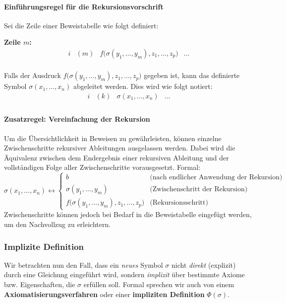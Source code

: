\documentclass[main.tex]{subfiles}
\begin{document}
\paragraph{Einführungsregel für die Rekursionsvorschrift}
Sei die Zeile einer Beweistabelle wie folgt definiert:

\textbf{Zeile \(m\):}
\[
\begin{array}{llll}
   i & (m) & f\big(\sigma(y_1, \ldots, y_m), z_1, \ldots, z_p\big) & \dots \\
\end{array}
\]

Falls der Ausdruck \(f\big(\sigma(y_1, \ldots, y_m), z_1, \ldots, z_p\big)\) gegeben ist, kann das definierte Symbol \(\sigma(x_1, \ldots, x_n)\) abgeleitet werden. Dies wird wie folgt notiert:
\[
\begin{array}{llll}
   i & (k) & \sigma(x_1, \ldots, x_n) & ... \\
\end{array}
\]

\paragraph{Zusatzregel: Vereinfachung der Rekursion}
Um die Übersichtlichkeit in Beweisen zu gewährleisten, können einzelne Zwischenschritte rekursiver Ableitungen ausgelassen werden. Dabei wird die Äquivalenz zwischen dem Endergebnis einer rekursiven Ableitung und der vollständigen Folge aller Zwischenschritte vorausgesetzt. Formal:
\[
\sigma(x_1, \ldots, x_n) \leftrightarrow 
\begin{cases} 
    b & \text{(nach endlicher Anwendung der Rekursion)} \\
    \sigma(y_1, \ldots, y_m) & \text{(Zwischenschritt der Rekursion)} \\
    f\big(\sigma(y_1, \ldots, y_m), z_1, \ldots, z_p\big) & \text{(Rekursionsschritt)}
\end{cases}
\]
Zwischenschritte können jedoch bei Bedarf in die Beweistabelle eingefügt werden, um den Nachvollzug zu erleichtern.


\subsubsection{Implizite Definition}
Wir betrachten nun den Fall, dass ein \emph{neues} Symbol \(\sigma\) nicht \emph{direkt} (explizit) durch eine Gleichung eingeführt wird, sondern \emph{implizit} über bestimmte Axiome bzw. Eigenschaften, die \(\sigma\) erfüllen soll. Formal sprechen wir auch von einem \textbf{Axiomatisierungsverfahren} oder einer \textbf{impliziten Definition} \(\Phi(\sigma)\).
\end{document}
